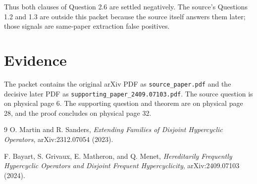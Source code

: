 \documentclass[11pt]{article}
\begin{document}
Thus both clauses of Question 2.6 are settled negatively.  The source's
Questions 1.2 and 1.3 are outside this packet because the source itself answers
them later; those signals are same-paper extraction false positives.

\section*{Evidence}
The packet contains the original arXiv PDF as \texttt{source\_paper.pdf} and
the decisive later PDF as
\texttt{supporting\_paper\_2409.07103.pdf}.  The source question is on physical
page 6.  The supporting question and theorem are on physical page 28, and the
proof concludes on physical page 32.

\begin{thebibliography}{9}
O. Martin and R. Sanders,
\emph{Extending Families of Disjoint Hypercyclic Operators},
arXiv:2312.07054 (2023).

F. Bayart, S. Grivaux, E. Matheron, and Q. Menet,
\emph{Hereditarily Frequently Hypercyclic Operators and Disjoint Frequent
Hypercyclicity}, arXiv:2409.07103 (2024).
\end{thebibliography}
\end{document}
